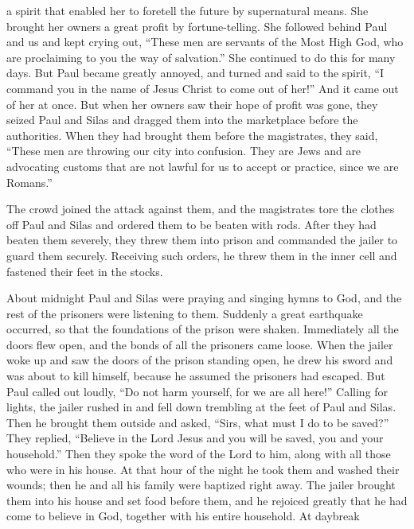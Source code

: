 {a spirit
that enabled
her to foretell the future by supernatural means.
She brought
her
owners
a great
profit
by fortune-telling.
She
followed behind
Paul
and
us
and kept crying out, “These
men
are
servants
of the Most High
God,
who
are proclaiming
to you
the way
of salvation.”
She continued to do
this
for
many
days.
But
Paul
became greatly annoyed,
and
turned
and said
to the spirit,
“I command
you
in
the name
of Jesus
Christ
to come out
of
her!” And
it came out
of her
at once.
But
when
her
owners
saw
their
hope
of profit
was gone,
they seized
Paul
and
Silas
and dragged
them into
the marketplace
before
the authorities.
When
they had brought
them
before the magistrates,
they said,
“These
men
are throwing
our
city
into confusion.
They are
Jews
and
are advocating
customs
that
are
not
lawful
for us
to accept
or
practice,
since we are
Romans.”
\par }{\PP {}The crowd
joined the attack
against
them,
and
the magistrates
tore
the clothes
off
Paul and Silas
and ordered
them to be beaten with rods.
After
they had beaten
them
severely,
they threw
them into
prison
and commanded
the jailer
to guard
them
securely.
Receiving
such
orders,
he threw
them
in
the inner cell
and fastened
their
feet
in
the stocks.
\par }{\PP {}About midnight
Paul
and
Silas
were praying
and singing hymns
to God,
and
the rest of the prisoners
were listening
to them.
Suddenly
a great
earthquake
occurred,
so that
the foundations
of the prison
were shaken.
Immediately
all
the doors
flew open,
and
the bonds
of all
the prisoners came loose.
When the jailer
woke up
and
saw
the doors
of the prison
standing open,
he drew
his sword
and was about
to kill
himself,
because he assumed
the prisoners
had escaped.
But
Paul
called out
loudly, “Do
not
harm
yourself,
for
we are
all
here!”
Calling
for lights,
the jailer rushed in
and
fell down
trembling
at the feet of Paul
and
Silas.
Then
he brought
them
outside
and asked,
“Sirs,
what
must
I
do
to
be saved?”
They
replied, “Believe
in
the Lord
Jesus
and
you will be saved,
you
and
your
household.”
Then
they spoke
the word
of the Lord
to him,
along with
all
those who were in
his
house.
At
that
hour
of the night
he took
them
and washed
their wounds;
then he
and
all
his family
were baptized
right away.
The jailer brought
them
into
his house
and set
food
before them, and
he rejoiced
greatly that he had come to believe
in God,
together with his entire household.
At daybreak
}
